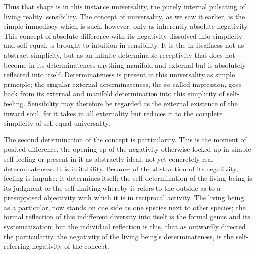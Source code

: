 Thus that shape is in this instance universality,
the purely internal pulsating of living reality, sensibility.
The concept of universality, as we saw it earlier,
is the simple immediacy which is such, however,
only as inherently absolute negativity.
This concept of absolute difference with
its negativity dissolved into simplicity and self-equal,
is brought to intuition in sensibility.
It is the in-itselfness not as abstract simplicity,
but as an infinite determinable receptivity
that does not become in its determinateness
anything manifold and external
but is absolutely reflected into itself.
Determinateness is present in this universality as simple principle;
the singular external determinateness, the so-called impression,
goes back from its external and manifold determination
into this simplicity of self-feeling.
Sensibility may therefore be regarded
as the external existence of the inward soul,
for it takes in all externality but reduces it
to the complete simplicity of self-equal universality.

The second determination of the concept is particularity.
This is the moment of posited difference,
the opening up of the negativity otherwise
locked up in simple self-feeling
or present in it as abstractly ideal,
not yet concretely real determinateness.
It is irritability.
Because of the abstraction of its negativity,
feeling is impulse;
it determines itself;
the self-determination of the living being is
its judgment or the self-limiting whereby
it refers to the outside as to a presupposed objectivity
with which it is in reciprocal activity.
The living being, as a particular,
now stands on one side as one species
next to other species;
the formal reflection of
this indifferent diversity into itself
is the formal genus and its systematization;
but the individual reflection is this,
that as outwardly directed the particularity,
the negativity of the living being's determinateness,
is the self-referring negativity of the concept.


